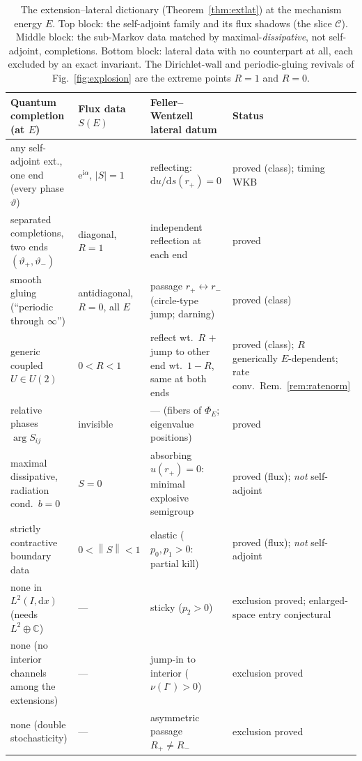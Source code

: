 \documentclass[11pt]{article}
\theoremstyle{definition}
\theoremstyle{remark}
\newcommand{\dd}{\mathrm{d}}
\newcommand{\ii}{\mathrm{i}}
\newcommand{\ee}{\mathrm{e}}
\newcommand{\norm}[1]{\left\lVert #1 \right\rVert}
\begin{document}
\begin{table}[t]
\centering
\small
\renewcommand{\arraystretch}{1.3}
\begin{tabular}{@{}p{}p{}p{}p{}@{}}
\toprule
\textbf{Quantum completion (at $E$)} & \textbf{Flux data $S(E)$} &
\textbf{Feller--Wentzell lateral datum} & \textbf{Status}\\
\midrule
any self-adjoint ext., one end (every phase $\vartheta$) &
$\ee^{\ii\alpha}$, $|S|=1$ &
reflecting: $\dd u/\dd s(r_{+})=0$ &
proved (class); timing WKB\\
separated completions, two ends $(\vartheta_{+},\vartheta_{-})$ &
diagonal, $R=1$ &
independent reflection at each end &
proved\\
smooth gluing (``periodic through $\infty$'') &
antidiagonal, $R=0$, all $E$ &
passage $r_{+}\leftrightarrow r_{-}$ (circle-type jump; darning) &
proved (class)\\
generic coupled $U\in U(2)$ &
$0<R<1$ &
reflect wt.\ $R$ $+$ jump to other end wt.\ $1-R$, same at both ends &
proved (class); $R$ generically $E$-dependent; rate conv.\
Rem.~\ref{rem:ratenorm}\\
relative phases $\arg S_{ij}$ &
invisible &
--- (fibers of $\Phi_{E}$; eigenvalue positions) &
proved\\
\midrule
maximal dissipative, radiation cond.\ $b=0$ &
$S=0$ &
absorbing $u(r_{+})=0$: minimal explosive semigroup &
proved (flux); \emph{not} self-adjoint\\
strictly contractive boundary data &
$0<\norm{S}<1$ &
elastic ($p_{0},p_{1}>0$: partial kill) &
proved (flux); \emph{not} self-adjoint\\
\midrule
none in $L^{2}(I,\dd x)$ (needs $L^{2}\oplus\mathbb{C}$) & --- &
sticky ($p_{2}>0$) &
exclusion proved; enlarged-space entry conjectural\\
none (no interior channels among the extensions) & --- &
jump-in to interior ($\nu(I^{\circ})>0$) &
exclusion proved\\
none (double stochasticity) & --- &
asymmetric passage $R_{+}\ne R_{-}$ &
exclusion proved\\
\bottomrule
\end{tabular}
\caption{The extension--lateral dictionary (Theorem~\ref{thm:extlat})
at the mechanism energy $E$. Top block: the self-adjoint family and its
flux shadows (the slice $\mathcal C$). Middle block: the sub-Markov data
matched by maximal-\emph{dissipative}, not self-adjoint, completions.
Bottom block: lateral data with no counterpart at all, each excluded by
an exact invariant. The Dirichlet-wall and periodic-gluing revivals of
Fig.~\ref{fig:explosion} are the extreme points $R=1$ and $R=0$.}
\label{tab:extlat}
\end{table}
\end{document}
